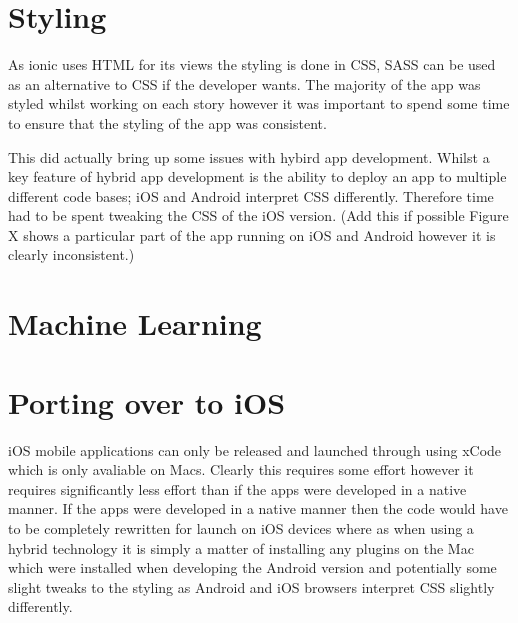 \section{Styling}
As ionic uses HTML for its views the styling is done in CSS, SASS can be used as an alternative to CSS if the developer wants. The majority of the app was styled whilst working on each story however it was important to spend some time to ensure that the styling of the app was consistent.

This did actually bring up some issues with hybird app development. Whilst a key feature of hybrid app development is the ability to deploy an app to multiple different code bases; iOS and Android interpret CSS differently. Therefore time had to be spent tweaking the CSS of the iOS version. (Add this if possible Figure X shows a particular part of the app running on iOS and Android however it is clearly inconsistent.)

\section{Machine Learning}

\section{Porting over to iOS}
iOS mobile applications can only be released and launched through using xCode which is only avaliable on Macs. Clearly this requires some effort however it requires significantly less effort than if the apps were developed in a native manner. If the apps were developed in a native manner then the code would have to be completely rewritten for launch on iOS devices where as when using a hybrid technology it is simply a matter of installing any plugins on the Mac which were installed when developing the Android version and potentially some slight tweaks to the styling as Android and iOS browsers interpret CSS slightly differently. 

